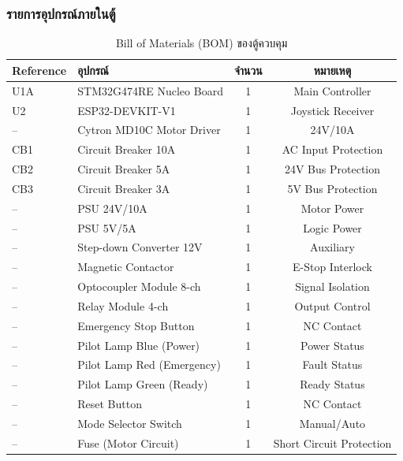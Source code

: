 \subsubsection{รายการอุปกรณ์ภายในตู้}
\label{subsubsec:cabinet_equipment_list}

\begin{table}[H]
  \centering
  \caption{Bill of Materials (BOM) ของตู้ควบคุม}
  \label{tab:bom}
  \begin{tabular}{llcc}
    \toprule
    Reference & อุปกรณ์ & จำนวน & หมายเหตุ \\
    \midrule
    U1A       & STM32G474RE Nucleo Board    & 1 & Main Controller \\
    U2        & ESP32-DEVKIT-V1             & 1 & Joystick Receiver \\
    --        & Cytron MD10C Motor Driver   & 1 & 24V/10A \\
    CB1       & Circuit Breaker 10A         & 1 & AC Input Protection \\
    CB2       & Circuit Breaker 5A          & 1 & 24V Bus Protection \\
    CB3       & Circuit Breaker 3A          & 1 & 5V Bus Protection \\
    --        & PSU 24V/10A                 & 1 & Motor Power \\
    --        & PSU 5V/5A                   & 1 & Logic Power \\
    --        & Step-down Converter 12V     & 1 & Auxiliary \\
    --        & Magnetic Contactor          & 1 & E-Stop Interlock \\
    --        & Optocoupler Module 8-ch     & 1 & Signal Isolation \\
    --        & Relay Module 4-ch           & 1 & Output Control \\
    --        & Emergency Stop Button       & 1 & NC Contact \\
    --        & Pilot Lamp Blue (Power)     & 1 & Power Status \\
    --        & Pilot Lamp Red (Emergency)  & 1 & Fault Status \\
    --        & Pilot Lamp Green (Ready)    & 1 & Ready Status \\
    --        & Reset Button                & 1 & NC Contact \\
    --        & Mode Selector Switch        & 1 & Manual/Auto \\
    --        & Fuse (Motor Circuit)        & 1 & Short Circuit Protection \\
    \bottomrule
  \end{tabular}
\end{table}

